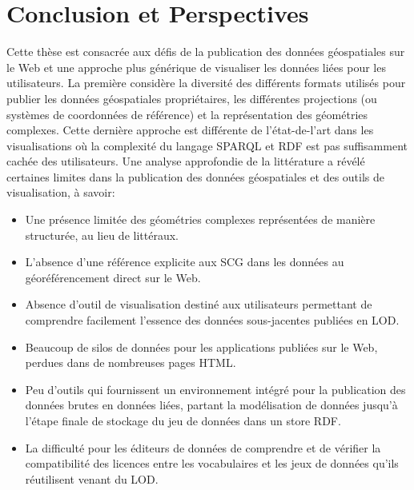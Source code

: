 \documentclass[a4paper,11pt,twoside]{report}
\begin{document}

\chapter*{ Conclusion et Perspectives}
\label{ch:conc}


Cette thèse est consacrée aux défis de la publication des données géospatiales sur le Web et une approche plus générique de visualiser les données liées pour les utilisateurs. La première considère la diversité des différents formats utilisés pour publier les données géospatiales propriétaires, les différentes projections (ou systèmes de coordonnées de référence) et la représentation des géométries complexes. Cette dernière approche est différente de l'état-de-l'art dans les visualisations où la complexité du langage SPARQL et RDF est pas suffisamment cachée des utilisateurs. Une analyse approfondie de la littérature a révélé certaines limites dans la publication des données géospatiales et des outils de visualisation, à savoir:

\begin{itemize}
\item  
Une présence limitée des géométries complexes représentées de manière structurée, au lieu de littéraux.

\item 
L'absence d'une référence explicite aux SCG dans les données au géoréférencement direct sur le Web.

\item 
Absence d'outil de visualisation destiné aux utilisateurs permettant de comprendre facilement l'essence des données sous-jacentes publiées en LOD.

\item 
Beaucoup de silos de données pour les applications publiées sur le Web, perdues dans de nombreuses pages HTML.

\item 
Peu d'outils qui fournissent un environnement intégré pour la publication des données brutes en données liées, partant la modélisation de données jusqu'à l'étape finale de stockage du jeu de données dans un store RDF. 

\item La difficulté pour les éditeurs de données de comprendre et de vérifier la compatibilité des licences entre les vocabulaires et les jeux de données qu'ils réutilisent venant du LOD.

  
\end{itemize}
\end{document}
